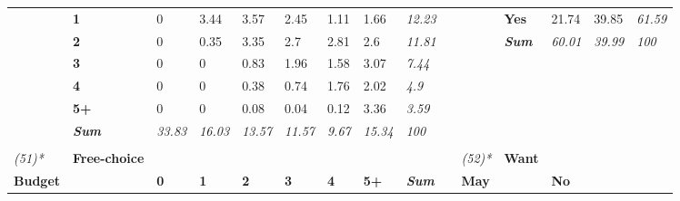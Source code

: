 {\begin{center}
\begin{longtable}{lllllllllllllll}
 &
  \textbf{1} &
  \cellcolor[HTML]{FFFFFF}0 &
  \cellcolor[HTML]{F6F6F6}3.44 &
  \cellcolor[HTML]{F6F6F6}3.57 &
  \cellcolor[HTML]{F9F9F9}2.45 &
  \cellcolor[HTML]{FDFDFD}1.11 &
  \cellcolor[HTML]{FBFBFB}1.66 &
  \textit{12.23} &
   &
   &
  \textbf{Yes} &
  \cellcolor[HTML]{CFCFCF}21.74 &
  \cellcolor[HTML]{A6A6A6}39.85 &
  \textit{61.59} \\
 &
  \textbf{2} &
  \cellcolor[HTML]{FFFFFF}0 &
  \cellcolor[HTML]{FFFFFF}0.35 &
  \cellcolor[HTML]{F7F7F7}3.35 &
  \cellcolor[HTML]{F8F8F8}2.7 &
  \cellcolor[HTML]{F8F8F8}2.81 &
  \cellcolor[HTML]{F9F9F9}2.6 &
  \textit{11.81} &
   &
   &
  \textit{\textbf{Sum}} &
  \textit{60.01} &
  \textit{39.99} &
  \textit{100} \\
 &
  \textbf{3} &
  \cellcolor[HTML]{FFFFFF}0 &
  \cellcolor[HTML]{FFFFFF}0 &
  \cellcolor[HTML]{FDFDFD}0.83 &
  \cellcolor[HTML]{FAFAFA}1.96 &
  \cellcolor[HTML]{FBFBFB}1.58 &
  \cellcolor[HTML]{F7F7F7}3.07 &
  \textit{7.44} &
   &
   &
   &
   &
   &
  \textit{} \\
 &
  \textbf{4} &
  \cellcolor[HTML]{FFFFFF}0 &
  \cellcolor[HTML]{FFFFFF}0 &
  \cellcolor[HTML]{FFFFFF}0.38 &
  \cellcolor[HTML]{FEFEFE}0.74 &
  \cellcolor[HTML]{FBFBFB}1.76 &
  \cellcolor[HTML]{FAFAFA}2.02 &
  \textit{4.9} &
   &
   &
   &
   &
   &
  \textit{} \\
 &
  \textbf{5+} &
  \cellcolor[HTML]{FFFFFF}0 &
  \cellcolor[HTML]{FFFFFF}0 &
  \cellcolor[HTML]{FFFFFF}0.08 &
  \cellcolor[HTML]{FFFFFF}0.04 &
  \cellcolor[HTML]{FFFFFF}0.12 &
  \cellcolor[HTML]{F7F7F7}3.36 &
  \textit{3.59} &
   &
   &
   &
   &
   &
  \textit{} \\
\textit{} &
  \textit{\textbf{Sum}} &
  \textit{33.83} &
  \textit{16.03} &
  \textit{13.57} &
  \textit{11.57} &
  \textit{9.67} &
  \textit{15.34} &
  \textit{100} &
  \textit{} &
  \textit{} &
  \textit{} &
  \textit{} &
  \textit{} &
  \textit{} \\
\textit{} &
  \textit{\textbf{}} &
  \textit{} &
  \textit{} &
  \textit{} &
  \textit{} &
  \textit{} &
  \textit{} &
  \textit{} &
  \textit{} &
  \textit{} &
  \textit{} &
  \textit{} &
  \textit{} &
  \textit{} \\
\textit{(51)*} &
  \textbf{Free-choice} &
   &
   &
   &
   &
   &
   &
  \textit{} &
   &
  \textit{(52)*} &
  \textbf{Want} &
   &
   &
  \textit{} \\
\textbf{Budget} &
   &
  \textbf{0} &
  \textbf{1} &
  \textbf{2} &
  \textbf{3} &
  \textbf{4} &
  \textbf{5+} &
  \textit{\textbf{Sum}} &
  \textbf{} &
  \textbf{May} &
   &
  \textbf{No} &

\end{longtable}
\end{center}}
